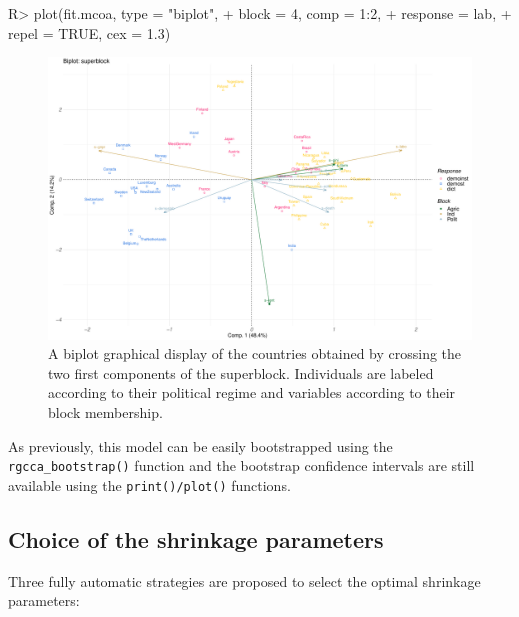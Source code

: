 \documentclass[
]{jss}
\begin{document}
\begin{CodeChunk}
\begin{CodeInput}
R> plot(fit.mcoa, type = "biplot", 
+      block = 4, comp = 1:2, 
+      response = lab, 
+      repel = TRUE, cex = 1.3)
\end{CodeInput}
\begin{figure}

{\centering \includegraphics{RGCCA_21022023_files/figure-latex/unnamed-chunk-17-1} 

}

\caption[A biplot graphical display of the countries obtained by crossing the two first components of the superblock]{A biplot graphical display of the countries obtained by crossing the two first components of the superblock. Individuals are labeled according to their political regime and variables according to their block membership.}\label{fig:unnamed-chunk-17}
\end{figure}
\end{CodeChunk}

\normalsize

As previously, this model can be easily bootstrapped using the
\texttt{rgcca\_bootstrap()} function and the bootstrap confidence
intervals are still available using the \texttt{print()/plot()}
functions.

\hypertarget{choice-of-the-shrinkage-parameters}{%
\subsection{Choice of the shrinkage
parameters}\label{choice-of-the-shrinkage-parameters}}

Three fully automatic strategies are proposed to select the optimal
shrinkage parameters:
\end{document}
